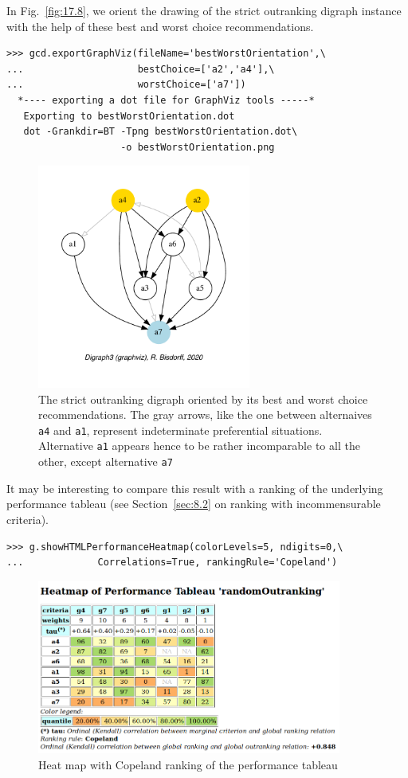 In Fig.~\vref{fig:17.8}, we orient the drawing of the strict outranking digraph instance with the help of these best and worst choice recommendations. 
\begin{lstlisting}
>>> gcd.exportGraphViz(fileName='bestWorstOrientation',\
...                    bestChoice=['a2','a4'],\
...                    worstChoice=['a7'])
  *---- exporting a dot file for GraphViz tools -----*
   Exporting to bestWorstOrientation.dot
   dot -Grankdir=BT -Tpng bestWorstOrientation.dot\
                    -o bestWorstOrientation.png
\end{lstlisting}
\begin{figure}[ht]
\sidecaption[t]
\includegraphics[width=7cm]{Figures/17-8-bestWorstOrientation.pdf}
\caption{The strict outranking digraph oriented by its best and worst choice recommendations. The gray arrows, like the one between alternaives \texttt{a4} and \texttt{a1}, represent indeterminate preferential situations. Alternative \texttt{a1} appears hence to be rather incomparable to all the other, except alternative \texttt{a7}}
\label{fig:17.8}       %
\end{figure}

It may be interesting to compare this result with a \Copeland ranking of the underlying performance tableau (see Section~\vref{sec:8.2} on ranking with incommensurable criteria).
\begin{lstlisting}
>>> g.showHTMLPerformanceHeatmap(colorLevels=5, ndigits=0,\
...             Correlations=True, rankingRule='Copeland')
\end{lstlisting}
\begin{figure}[ht]
\includegraphics[width=10cm]{Figures/17-9-outRankingResult.png}
\caption{Heat map with Copeland ranking of the performance tableau}
\label{fig:17.9}       %
\end{figure}

